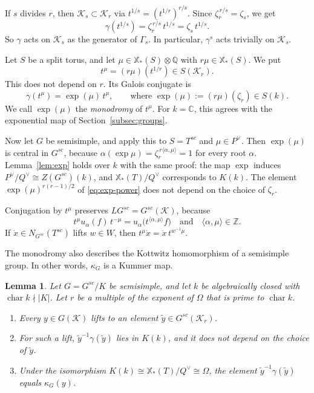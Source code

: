 \documentclass[psamsfonts]{amsart}
\newtheorem{lem}[thm]{Lemma}
\theoremstyle{definition}
\theoremstyle{remark}
\numberwithin{equation}{section}
\newcommand{\Z}{\mathbb{Z}}   %
\newcommand{\Q}{\mathbb{Q}}
\newcommand{\X}{\mathbb{X}}
\DeclareMathOperator{\chara}{char}
\newcommand\cK{\mathcal{K}}
\newcommand{\CC}{\mathbb{C}}
\numberwithin{equation}{section}
\newcommand{\Om}{\Omega}
\theoremstyle{plain}
\begin{document}
If $s$ divides $r$, then $\cK_s\subset\cK_r$ via $t^{1/s}=(t^{1/r})^{r/s}$. Since $\zeta_r^{\,r/s}=\zeta_s$, we get
\[
\gamma(t^{1/s})=\zeta_r^{\,r/s}\,t^{1/s}=\zeta_s\,t^{1/s}.
\]
So $\gamma$ acts on $\cK_s$ as the generator of $\Gamma_s$. In particular, $\gamma^s$ acts trivially on $\cK_s$.

Let $S$ be a split torus, and let $\mu\in\X_*(S)\otimes\Q$ with $r\mu\in\X_*(S)$. We put
\[
t^\mu=(r\mu)(t^{1/r})\in S(\cK_r).
\]
This does not depend on $r$. Its Galois conjugate is
\begin{equation}\label{eq:monodromy}
\gamma(t^\mu)=\exp(\mu)\,t^\mu,\qquad\text{where }\exp(\mu):=(r\mu)(\zeta_r)\in S(k).
\end{equation}
We call $\exp(\mu)$ the \emph{monodromy} of $t^\mu$. For $k=\CC$, this agrees with the exponential map of Section~\ref{subsec:groups}.

Now let $G$ be semisimple, and apply this to $S=T^{sc}$ and $\mu\in P^\vee$. Then $\exp(\mu)$ is central in $G^{sc}$, because $\alpha(\exp\mu)=\zeta_r^{\,r\langle\alpha,\mu\rangle}=1$ for every root $\alpha$. Lemma~\ref{lem:exp} holds over $k$ with the same proof: the map $\exp$ induces $P^\vee/Q^\vee\cong Z(G^{sc})(k)$, and $\X_*(T)/Q^\vee$ corresponds to $K(k)$. The element $\exp(\mu)^{r(r-1)/2}$ of \eqref{eq:exp-power} does not depend on the choice of $\zeta_r$.

Conjugation by $t^\mu$ preserves $LG^{sc}=G^{sc}(\cK)$, because
\[
t^\mu u_\alpha(f)\,t^{-\mu}=u_\alpha\big(t^{\langle\alpha,\mu\rangle}f\big)\quad\text{and}\quad\langle\alpha,\mu\rangle\in\Z.
\]
If $\dot x\in N_{G^{sc}}(T^{sc})$ lifts $w\in W$, then $t^\mu\dot x=\dot x\,t^{w^{-1}\mu}$.

The monodromy also describes the Kottwitz homomorphism of a semisimple group. In other words, $\kappa_G$ is a Kummer map.

\begin{lem}\label{lem:kummer}
Let $G=G^{sc}/K$ be semisimple, and let $k$ be algebraically closed with $\chara k\nmid|K|$. Let $r$ be a multiple of the exponent of $\Om$ that is prime to $\chara k$.
\begin{enumerate}[(1)]
\item Every $y\in G(\cK)$ lifts to an element $\tilde y\in G^{sc}(\cK_r)$.
\item For such a lift, $\tilde y^{-1}\gamma(\tilde y)$ lies in $K(k)$, and it does not depend on the choice of $\tilde y$.
\item Under the isomorphism $K(k)\cong\X_*(T)/Q^\vee\cong\Om$, the element $\tilde y^{-1}\gamma(\tilde y)$ equals $\kappa_G(y)$.
\end{enumerate}
\end{lem}
\end{document}
